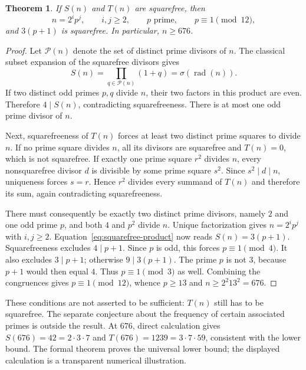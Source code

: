 \documentclass[11pt]{article}
\newtheorem{theorem}{Theorem}[section]
\begin{document}
\begin{theorem}\label{thm:squarefree}
If $S(n)$ and $T(n)$ are squarefree, then
\[
n=2^i p^j,\qquad i,j\ge2,\qquad p\text{ prime},\qquad
p\equiv1\pmod{12},
\]
and $3(p+1)$ is squarefree. In particular, $n\ge676$.
\end{theorem}

\begin{proof}
Let $\mathcal P(n)$ denote the set of distinct prime divisors of $n$.
The classical subset expansion of the squarefree divisors gives
\begin{equation}\label{eq:squarefree-product}
S(n)=\prod_{q\in\mathcal P(n)}(1+q)
     =\sigma(\operatorname{rad}(n)).
\end{equation}
If two distinct odd primes $p,q$ divide $n$, their two factors in this
product are even. Therefore $4\mid S(n)$, contradicting squarefreeness.
There is at most one odd prime divisor of $n$.

Next, squarefreeness of $T(n)$ forces at least two distinct prime squares
to divide $n$. If no prime square divides $n$, all its divisors are
squarefree and $T(n)=0$, which is not squarefree. If exactly one prime
square $r^2$ divides $n$, every nonsquarefree divisor $d$ is divisible by
some prime square $s^2$. Since $s^2\mid d\mid n$, uniqueness forces
$s=r$. Hence $r^2$ divides every summand of $T(n)$ and therefore its
sum, again contradicting squarefreeness.

There must consequently be exactly two distinct prime divisors, namely
$2$ and one odd prime $p$, and both $4$ and $p^2$ divide $n$. Unique
factorization gives $n=2^i p^j$ with $i,j\ge2$.
Equation~\eqref{eq:squarefree-product} now reads $S(n)=3(p+1)$.
Squarefreeness excludes $4\mid p+1$. Since $p$ is odd, this forces
$p\equiv1\pmod4$. It also excludes $3\mid p+1$; otherwise
$9\mid3(p+1)$. The prime $p$ is not $3$, because $p+1$ would then
equal $4$. Thus $p\equiv1\pmod3$ as well. Combining the congruences
gives $p\equiv1\pmod{12}$, whence $p\ge13$ and
$n\ge2^2 13^2=676$.
\end{proof}

These conditions are not asserted to be sufficient: $T(n)$ still has
to be squarefree. The separate conjecture about the frequency of certain
associated primes is outside the result. At $676$, direct calculation
gives $S(676)=42=2\cdot3\cdot7$ and
$T(676)=1239=3\cdot7\cdot59$, consistent with the lower bound.
The formal theorem proves the universal lower bound; the displayed
calculation is a transparent numerical illustration.
\end{document}
